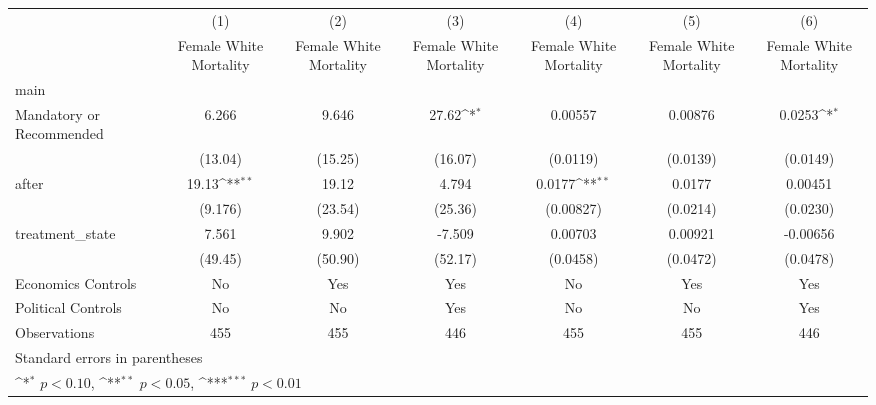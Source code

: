 {
\def\sym#1{\ifmmode^{#1}\else\(^{#1}\)\fi}
\begin{longtable}{l*{6}{c}}
\hline\hline\endfirsthead\hline\endhead\hline\endfoot\endlastfoot
                    &\multicolumn{1}{c}{(1)}&\multicolumn{1}{c}{(2)}&\multicolumn{1}{c}{(3)}&\multicolumn{1}{c}{(4)}&\multicolumn{1}{c}{(5)}&\multicolumn{1}{c}{(6)}\\
                    &\multicolumn{1}{c}{Female White Mortality}&\multicolumn{1}{c}{Female White Mortality}&\multicolumn{1}{c}{Female White Mortality}&\multicolumn{1}{c}{Female White Mortality}&\multicolumn{1}{c}{Female White Mortality}&\multicolumn{1}{c}{Female White Mortality}\\
\hline
main                &                     &                     &                     &                     &                     &                     \\
Mandatory or Recommended&       6.266         &       9.646         &       27.62\sym{*}  &     0.00557         &     0.00876         &      0.0253\sym{*}  \\
                    &     (13.04)         &     (15.25)         &     (16.07)         &    (0.0119)         &    (0.0139)         &    (0.0149)         \\
[1em]
after               &       19.13\sym{**} &       19.12         &       4.794         &      0.0177\sym{**} &      0.0177         &     0.00451         \\
                    &     (9.176)         &     (23.54)         &     (25.36)         &   (0.00827)         &    (0.0214)         &    (0.0230)         \\
[1em]
treatment\_state     &       7.561         &       9.902         &      -7.509         &     0.00703         &     0.00921         &    -0.00656         \\
                    &     (49.45)         &     (50.90)         &     (52.17)         &    (0.0458)         &    (0.0472)         &    (0.0478)         \\
[1em]
Economics Controls  &          No         &         Yes         &         Yes         &          No         &         Yes         &         Yes         \\
[1em]
Political Controls  &          No         &          No         &         Yes         &          No         &          No         &         Yes         \\
\hline
Observations        &         455         &         455         &         446         &         455         &         455         &         446         \\
\hline\hline
\multicolumn{7}{l}{\footnotesize Standard errors in parentheses}\\
\multicolumn{7}{l}{\footnotesize \sym{*} \(p<0.10\), \sym{**} \(p<0.05\), \sym{***} \(p<0.01\)}\\
\end{longtable}
}
